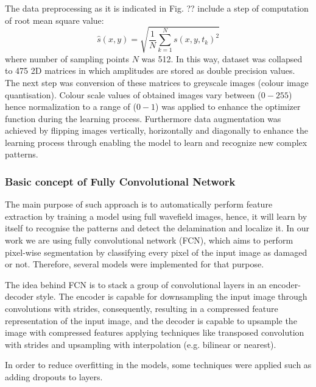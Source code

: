 \documentclass[preprint,9pt]{elsarticle}
\begin{document}
	The data preprocessing as it is indicated in Fig. ?? include a step of computation of root mean square value:
	\begin{equation}
		\hat{s}(x,y) = \sqrt{\frac{1}{N}\sum_{k=1}^{N} s(x,y,t_k)^2}
	\end{equation}
	where number of sampling points \(N\) was 512.
	In this way, dataset was collapsed to 475 2D matrices in which amplitudes are stored as double precision values.
	The next step was conversion of these matrices to greyscale images (colour image quantisation).
	Colour scale values of obtained images vary between (\(0 - 255\)) hence normalization
	to a range of (\(0-1\)) was applied to enhance the optimizer function during the learning process. 
	Furthermore data augmentation was achieved by flipping images vertically, horizontally and diagonally to enhance the learning process through enabling the model to learn and recognize new complex patterns.
	\subsubsection{Basic concept of Fully Convolutional Network}
	The main purpose of such approach is to automatically perform feature extraction by training a model using full wavefield images, hence, it will learn by itself to recognise the patterns and detect the delamination and localize it.
	In our work we are using fully convolutional network (FCN), which aims to perform pixel-wise segmentation by classifying every pixel of the input image as damaged or not. 
	Therefore, several models were implemented for that purpose.

	The idea behind FCN is to stack a group of convolutional layers in an encoder-decoder style. 
	The encoder is capable for downsampling the input image through convolutions with strides, consequently, resulting in a compressed feature representation of the input image, and the decoder is capable to upsample the image with compressed features applying techniques like transposed convolution with strides and upsampling with interpolation (e.g. bilinear or nearest).


	In order to reduce overfitting in the models, some techniques were applied such as adding dropouts to layers.
\end{document}
